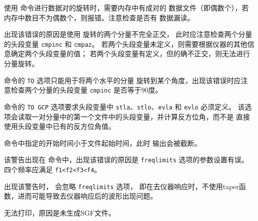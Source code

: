 使用  命令进行数据对的旋转时，需要内存中有成对的
数据文件（即偶数个），若内存中数目不为偶数个，则报错。注意检查是否有
数据漏读。

出现该错误的原因是使用  旋转的两个分量不完全正交，
此时应注意检查两个分量的头段变量 \texttt{cmpinc} 和 \texttt{cmpaz}。
若两个头段变量未定义，则需要根据仪器的其他信息确定两个头段变量的值；
若两个头段变量有定义，但的确不正交，则无法进行分量旋转。

 命令的 \texttt{TO} 选项只能用于将两个水平的分量
旋转到某个角度，出现该错误时应注意检查两个分量的头段变量 \texttt{cmpinc}
是否等于90度。

 命令的 \texttt{TO GCP} 选项要求头段变量中
\texttt{stla}、\texttt{stlo}、\texttt{evla} 和 \texttt{evlo} 必须定义。
该选项会读取一对分量中的第一个文件中的头段变量，并计算反方位角，而不是
直接使用头段变量中已有的反方位角值。

 命令中指定的开始时间小于文件起始时间，此时
输出会被截断。

该警告出现在  命令中，出现该错误的原因是 \texttt{freqlimits}
选项的参数设置有误。四个频率应满足 \texttt{f1<f2<f3<f4}。

出现该警告时， 会忽略 \texttt{freqlimits} 选项，
即在去仪器响应时，不使用taper函数，进而可能导致去仪器响应后的波形出现问题。

无法打印，原因是未生成SGF文件。
